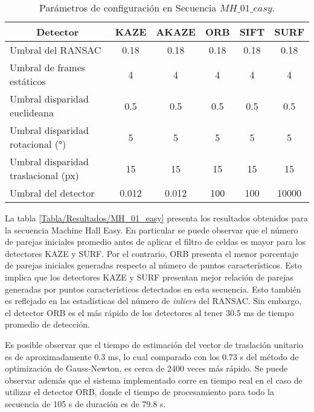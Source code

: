 \begin{table}[H]
	\caption{Parámetros de configuración en Secuencia $MH\_ 01\_ easy$.}
	\begin{tabular}{|l|c|c|c|c|c|}
		\hline
		\multicolumn{1}{|c|}{\textbf{Detector}} & \textbf{KAZE} & \textbf{AKAZE} & \textbf{ORB} & \textbf{SIFT} & \textbf{SURF} \\ \hline
		Umbral del RANSAC & 0.18 & 0.18 & 0.18 & 0.18 & 0.18 \\ \hline
		Umbral de frames estáticos & 4 & 4 & 4 & 4 & 4 \\ \hline
		Umbral disparidad euclideana & 0.5 & 0.5 & 0.5 & 0.5 & 0.5 \\ \hline
		Umbral disparidad rotacional (°) & 5 & 5 & 5 & 5 & 5 \\ \hline
		Umbral disparidad traslacional (px) & 15 & 15 & 15 & 15 & 15 \\ \hline
		Umbral del detector & 0.012 & 0.012 & 100 & 100 & 10000 \\ \hline
	\end{tabular}
	\label{Tabla/Parametros/MH_01_easy}
\end{table}


La tabla \ref{Tabla/Resultados/MH_01_easy} presenta los resultados obtenidos para la secuencia Machine Hall Easy. En particular  se puede observar que el número de parejas iniciales  promedio antes de aplicar el filtro de celdas es mayor para los detectores KAZE y SURF. Por el contrario, ORB presenta el menor porcentaje de parejas iniciales generadas respecto al número de puntos característicos. Esto implica que los detectores KAZE y SURF presentan mejor relación de parejas generadas por puntos característicos detectados en esta secuencia. Esto también es reflejado en las estadísticas del número de \textit{inliers} del RANSAC.  Sin embargo, el detector ORB es el más rápido de los detectores al tener 30.5 ms de tiempo promedio de detección.

Es posible observar que el tiempo de estimación del vector de traslación unitario es de aproximadamente 0.3 ms, lo cual comparado con los 0.73 s del método de optimización de Gauss-Newton, es cerca de 2400 veces más rápido. Se puede observar además que el sistema implementado corre en tiempo real en el caso de utilizar el detector ORB, donde el tiempo de procesamiento para todo la secuencia de 105 s de duración es de 79.8 s.


